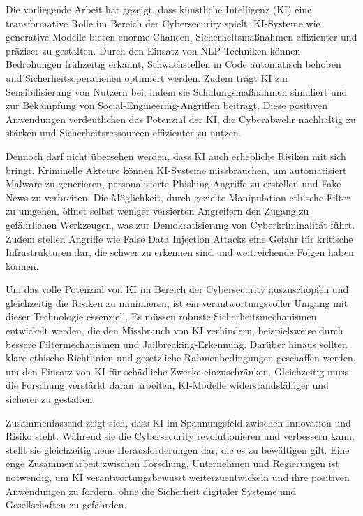 \documentclass[a4paper,10pt,parskip,twocolumn]{article}
\begin{document}
Die vorliegende Arbeit hat gezeigt, dass künstliche Intelligenz (KI) eine transformative Rolle im Bereich der Cybersecurity spielt. KI-Systeme wie generative Modelle bieten enorme Chancen, Sicherheitsmaßnahmen effizienter und präziser zu gestalten. Durch den Einsatz von NLP-Techniken können Bedrohungen frühzeitig erkannt, Schwachstellen in Code automatisch behoben und Sicherheitsoperationen optimiert werden. Zudem trägt KI zur Sensibilisierung von Nutzern bei, indem sie Schulungsmaßnahmen simuliert und zur Bekämpfung von Social-Engineering-Angriffen beiträgt. Diese positiven Anwendungen verdeutlichen das Potenzial der KI, die Cyberabwehr nachhaltig zu stärken und Sicherheitsressourcen effizienter zu nutzen.

Dennoch darf nicht übersehen werden, dass KI auch erhebliche Risiken mit sich bringt. Kriminelle Akteure können KI-Systeme missbrauchen, um automatisiert Malware zu generieren, personalisierte Phishing-Angriffe zu erstellen und Fake News zu verbreiten. Die Möglichkeit, durch gezielte Manipulation ethische Filter zu umgehen, öffnet selbst weniger versierten Angreifern den Zugang zu gefährlichen Werkzeugen, was zur Demokratisierung von Cyberkriminalität führt. Zudem stellen Angriffe wie False Data Injection Attacks eine Gefahr für kritische Infrastrukturen dar, die schwer zu erkennen sind und weitreichende Folgen haben können.

Um das volle Potenzial von KI im Bereich der Cybersecurity auszuschöpfen und gleichzeitig die Risiken zu minimieren, ist ein verantwortungsvoller Umgang mit dieser Technologie essenziell. Es müssen robuste Sicherheitsmechanismen entwickelt werden, die den Missbrauch von KI verhindern, beispielsweise durch bessere Filtermechanismen und Jailbreaking-Erkennung. Darüber hinaus sollten klare ethische Richtlinien und gesetzliche Rahmenbedingungen geschaffen werden, um den Einsatz von KI für schädliche Zwecke einzuschränken. Gleichzeitig muss die Forschung verstärkt daran arbeiten, KI-Modelle widerstandsfähiger und sicherer zu gestalten.

Zusammenfassend zeigt sich, dass KI im Spannungsfeld zwischen Innovation und Risiko steht. Während sie die Cybersecurity revolutionieren und verbessern kann, stellt sie gleichzeitig neue Herausforderungen dar, die es zu bewältigen gilt. Eine enge Zusammenarbeit zwischen Forschung, Unternehmen und Regierungen ist notwendig, um KI verantwortungsbewusst weiterzuentwickeln und ihre positiven Anwendungen zu fördern, ohne die Sicherheit digitaler Systeme und Gesellschaften zu gefährden.
\end{document}
